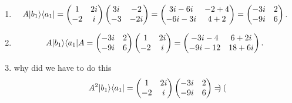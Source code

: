 \documentclass[11pt, letterpaper]{article}
\begin{document}
\begin{enumerate}
\[\begin{pmatrix}
			-1 \\
			-i
			\end{pmatrix}\begin{pmatrix}
			3i & 2
			\end{pmatrix}^* = \begin{pmatrix}
			-1 \\
			-i
			\end{pmatrix}\begin{pmatrix}
			-3i & 2
			\end{pmatrix}=\begin{pmatrix}
			3i & -2 \\
			-3 & -2i
			\end{pmatrix}
		.\]
	\item
		\[
			A \lvert b_1\rangle \langle a_1\rvert =\begin{pmatrix}
			1 & 2i \\
			-2 & i
			\end{pmatrix}\begin{pmatrix}
			3i & -2 \\
			-3 & -2i
			\end{pmatrix}=\begin{pmatrix}
			3i-6i & -2+4 \\
			-6i-3i & 4+2
			\end{pmatrix}=\begin{pmatrix}
			-3i & 2 \\
			-9i & 6
			\end{pmatrix}
		.\]
	\item
		\[
			A \lvert b_1\rangle \langle a_1\rvert A= \begin{pmatrix}
			-3i & 2 \\
			-9i & 6
			\end{pmatrix}\begin{pmatrix}
			1 & 2i \\
			-2 & i
			\end{pmatrix}=\begin{pmatrix}
			-3i-4 & 6+2i \\
			-9i-12 & 18+6i
			\end{pmatrix}
		.\]
	\item why did we have to do this
		\[
			A^2 \lvert b_1\rangle \langle a_1\rvert =\begin{pmatrix}
			1 & 2i \\
			-2 & i
			\end{pmatrix}\begin{pmatrix}
			-3i & 2 \\
			-9i & 6
			\end{pmatrix}=\begin{pmatrix}

\end{pmatrix}\]
\end{enumerate}
\end{document}
